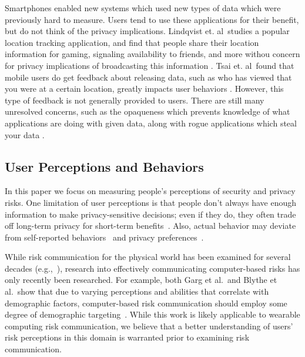 Smartphones enabled new systems which used new types of data which were previously hard to measure. Users tend to use these applications for their benefit, but do not think of the privacy implications. Lindqvist et. al\  studies a popular location tracking application, and find that people share their location information for gaming, signaling availability to friends, and more withou concern for privacy implications of broadcasting this information \cite{lindqvist2011m}. Tsai et. al\ found that mobile users do get feedback about releasing data, such as who has viewed that you were at a certain location, greatly impacts user behaviors \cite{Tsai2009}. However, this type of feedback is not generally provided to users. There are still many unresolved concerns, such as the opaqueness which prevents knowledge of what applications are doing with given data, along with rogue applications which steal your data \cite{1_kane_2010, zhou2011taming}.


\subsection{User Perceptions and Behaviors}
In this paper we focus on measuring people's perceptions of security and privacy risks. One limitation of user perceptions is that people don't always have enough information to make privacy-sensitive decisions; even if they do, they often trade off long-term privacy for short-term benefits~\cite{acquisti2005privacy}. Also, actual behavior may deviate from self-reported behaviors~\cite{jensen2005privacy} and privacy preferences~\cite{spiekermann2001privacy}.

While risk communication for the physical world has been examined for several decades (e.g.,~\cite{Fischhoff,Morgan2001}), research into effectively communicating computer-based risks has only recently been researched. For example, both Garg et al.\ and Blythe et al.\ show that due to varying perceptions and abilities that correlate with demographic factors, computer-based risk communication should employ some degree of demographic targeting~\cite{Garg2012,Blythe2011}. While this work is likely applicable to wearable computing risk communication, we believe that a better understanding of users' risk perceptions in this domain is warranted prior to examining risk communication.
